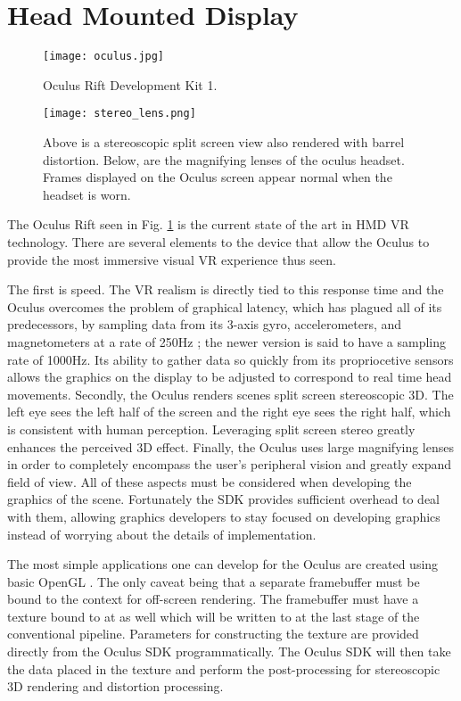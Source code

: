 \section{Head Mounted Display}
\label{sec:hmd}

\begin{figure}[]
\centering
\texttt{[image: oculus.jpg]}
\caption{Oculus Rift Development Kit 1. 
\cite{website:pcworld}}
\label{fig:oculus}
\end{figure}

\begin{figure}[]
\centering
\texttt{[image: stereo\_lens.png]}
\caption{Above is a stereoscopic split screen view also rendered with barrel distortion.
    Below, are the magnifying lenses of the oculus headset.
Frames displayed on the Oculus screen appear normal when the headset is worn.}
\label{fig:stereo}
\end{figure}


The Oculus Rift seen in Fig. \ref{fig:oculus} is the current state of the art
in HMD VR technology. There are several elements to the device that allow the
Oculus to provide the most immersive visual VR experience thus seen.

The first is speed.  The VR realism is directly tied to this response time and
the Oculus overcomes the problem of graphical latency, which has plagued all of
its predecessors, by sampling data from its 3-axis gyro, accelerometers, and
magnetometers at a rate of 250Hz \cite{website:roadtovr}; the newer version is
said to have a sampling rate of 1000Hz. Its ability to gather data so quickly
from its propriocetive sensors allows the graphics on the display to be
adjusted to correspond to real time head movements. Secondly, the Oculus
renders scenes split screen stereoscopic 3D. The left eye sees the left half of
the screen and the right eye sees the right half, which is consistent with
human perception. Leveraging split screen stereo greatly enhances the perceived
3D effect. Finally, the Oculus uses large magnifying lenses in order to
completely encompass the user's peripheral vision and greatly expand field of
view. All of these aspects must be considered when developing the graphics of
the scene. Fortunately the SDK provides sufficient overhead to deal with them,
allowing graphics developers to stay focused on developing graphics instead of
worrying about the details of implementation.

The most simple applications one can develop for the Oculus are created using
basic OpenGL \cite{website:opengl}. The only caveat being that a separate
framebuffer must be bound to the context for off-screen rendering. The
framebuffer must have a texture bound to at as well which will be written to at
the last stage of the conventional pipeline. Parameters for constructing the
texture are provided directly from the Oculus SDK programmatically. The Oculus
SDK will then take the data placed in the texture and perform the
post-processing for stereoscopic 3D rendering and distortion processing. 

